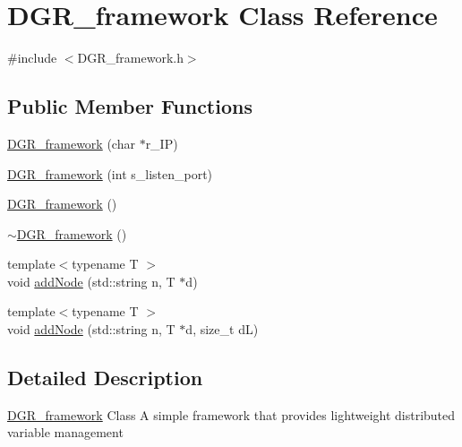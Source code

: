 \hypertarget{classDGR__framework}{\section{D\+G\+R\+\_\+framework Class Reference}
\label{classDGR__framework}
}


{\ttfamily \#include $<$D\+G\+R\+\_\+framework.\+h$>$}

\subsection*{Public Member Functions}
\begin{DoxyCompactItemize}
\item 
\hyperlink{classDGR__framework_a3c397bacb6d9f5415c1ccd91d68da842}{D\+G\+R\+\_\+framework} (char $\ast$r\+\_\+\+I\+P)
\item 
\hyperlink{classDGR__framework_ae7789d2c0b2e6a3f5b713ad5b87dda49}{D\+G\+R\+\_\+framework} (int s\+\_\+listen\+\_\+port)
\item 
\hyperlink{classDGR__framework_a30d61a56e39d2e240da947a0fa1412b4}{D\+G\+R\+\_\+framework} ()
\item 
\hyperlink{classDGR__framework_a626da0fafccee9e655bcb71691b17f87}{$\sim$\+D\+G\+R\+\_\+framework} ()
\item 
{\footnotesize template$<$typename T $>$ }\\void \hyperlink{classDGR__framework_aadf62190c414a2b7799d630d807cd075}{add\+Node} (std\+::string n, T $\ast$d)
\item 
{\footnotesize template$<$typename T $>$ }\\void \hyperlink{classDGR__framework_ab669babf74d62fb60b46ef31439cb63a}{add\+Node} (std\+::string n, T $\ast$d, size\+\_\+t d\+L)
\end{DoxyCompactItemize}


\subsection{Detailed Description}
\hyperlink{classDGR__framework}{D\+G\+R\+\_\+framework} Class A simple framework that provides lightweight distributed variable management 

